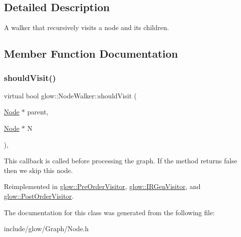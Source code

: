 \subsection{Detailed Description}
A walker that recursively visits a node and its children. 

\subsection{Member Function Documentation}
\mbox{\label{classglow_1_1_node_walker_a33532d7a4fe24f71c1b763c53182b20b}} 
\subsubsection{\texorpdfstring{should\+Visit()}{shouldVisit()}}
{\footnotesize\ttfamily virtual bool glow\+::\+Node\+Walker\+::should\+Visit (\begin{DoxyParamCaption}\item[{\hyperlink{classglow_1_1_node}{Node} $\ast$}]{parent,  }\item[{\hyperlink{classglow_1_1_node}{Node} $\ast$}]{N }\end{DoxyParamCaption})\hspace{0.3cm}{\ttfamily [inline]}, {\ttfamily [virtual]}}

This callback is called before processing the graph. If the method returns false then we skip this node. 

Reimplemented in \hyperlink{structglow_1_1_pre_order_visitor_ac8c137afc60efc698bfcaca489b073db}{glow\+::\+Pre\+Order\+Visitor}, \hyperlink{classglow_1_1_i_r_gen_visitor_a5f5fe967edc74e4a65e5c4d76affac80}{glow\+::\+I\+R\+Gen\+Visitor}, and \hyperlink{structglow_1_1_post_order_visitor_aac9bad1f6f91fb1f9328061e4a4fce68}{glow\+::\+Post\+Order\+Visitor}.



The documentation for this class was generated from the following file\+:\begin{DoxyCompactItemize}
\item 
include/glow/\+Graph/Node.\+h\end{DoxyCompactItemize}
